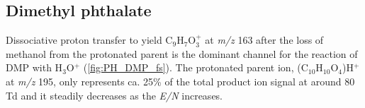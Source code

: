 









\subsection{Dimethyl phthalate}


Dissociative proton transfer to yield C$_9$H$_{7}$O$_3^+$ at \textit{m/z} 163 after the loss of methanol from the protonated parent 
is the dominant channel for the reaction of DMP with H$_3$O$^+$ (\autoref{fig:PH_DMP_fs}).
The protonated parent ion, (C$_{10}$H$_{10}$O$_4$)H$^+$ at \textit{m/z} 195, only represents ca. 25\% of the total product ion signal at around 80 Td and it steadily decreases as the \textit{E/N} increases.

